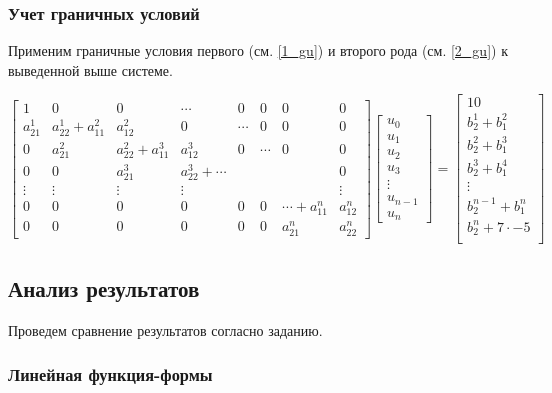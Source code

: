 \subsubsection{Учет граничных условий}

Применим граничные условия первого (см. \ref{1_gu}) и  второго  рода (см. \ref{2_gu}) к выведенной выше системе.

$$
\begin{bmatrix}
1 & 0 &   0 & \cdots & 0 & 0 & 0  & 0\\
a_{21}^1 & a_{22}^1+a_{11}^2 & a_{12}^2  & 0 & \cdots & 0 & 0  & 0\\
0 & a_{21}^2 & a_{22}^2+a_{11}^3  &  a_{12}^3  & 0 & \cdots & 0  & 0\\
0 & 0 & a_{21}^3  & a_{22}^3+ \cdots  &  & &   & 0\\
\vdots & \vdots & \vdots & \vdots &  &  &   & \vdots\\
0 & 0 & 0 & 0 &  0 & 0 & \cdots+a_{11}^n  & a_{12}^n\\
0 & 0 & 0 & 0 &  0 & 0 & a_{21}^n  & a_{22}^n
\end{bmatrix}
\begin{bmatrix}
u_0 \\
u_1 \\
u_2\\
u_3\\
\vdots\\
u_{n-1}\\
u_n
\end{bmatrix} =
\begin{bmatrix}
 10   \\
b_2^1+b_1^2\\
b_2^2+b_1^3\\
b_2^3+b_1^4\\
\vdots\\
b_2^{n-1}+b_1^n\\
 b_2^n   +7  \cdot -5   \\
\end{bmatrix}
$$

\subsection{Анализ результатов}

Проведем сравнение результатов согласно заданию.

\subsubsection{Линейная функция-формы}


